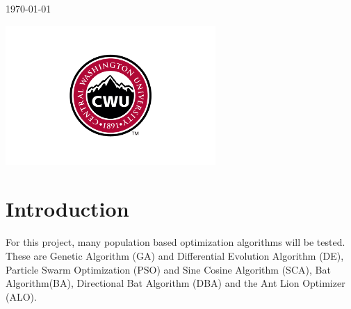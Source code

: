 \documentclass[12pt]{article}
\begin{document}
\begin{titlepage}
        
        \vfill
        
        {\large \today}\\ %
        
        \vfill
        
        \includegraphics[width=8cm]{CWU-Logo.png}\\[.5cm] %
        
        
        \vfill %
        
    \end{titlepage}
    \newpage
    \tableofcontents
    \newpage
    
    
    
    \section{Introduction}
    
    For this project, many population based optimization algorithms will be tested. These are Genetic Algorithm (GA) and Differential Evolution Algorithm (DE), Particle Swarm Optimization (PSO) and Sine Cosine Algorithm (SCA), Bat Algorithm(BA), Directional Bat Algorithm (DBA) and the Ant Lion Optimizer (ALO).
\end{document}

